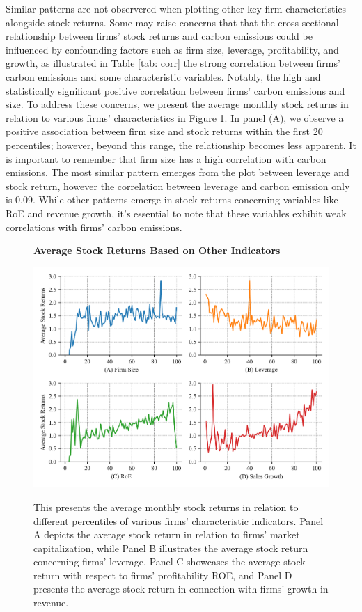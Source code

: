 \documentclass[12pt]{article}
\begin{document}
Similar patterns are not observered when plotting other key firm characteristics alongside stock returns. Some may raise concerns that that the cross-sectional relationship between firms' stock returns and carbon emissions could be influenced by confounding factors such as firm size, leverage, profitability, and growth, as illustrated in Table \ref{tab: corr} the strong correlation between firms' carbon emissions and some characteristic variables. Notably, the high and statistically significant positive correlation between firms' carbon emissions and size. To address these concerns, we present the average monthly stock returns in relation to various firms' characteristics in Figure \ref{fig: others_persentile}. In panel (A), we observe a positive association between firm size and stock returns within the first 20 percentiles; however, beyond this range, the relationship becomes less apparent. It is important to remember that firm size has a high correlation with carbon emissions. The most similar pattern emerges from the plot between leverage and stock return, however the correlation between leverage and carbon emission only is 0.09. While other patterns emerge in stock returns concerning variables like RoE and revenue growth, it's essential to note that these variables exhibit weak correlations with firms' carbon emissions.
\begin{figure}[!ht]
\centering
\caption{\textbf{Average Stock Returns Based on Other Indicators}}
\includegraphics{graphics/other_percentile.png}
\label{fig: others_persentile}
\caption*{\footnotesize{This presents the average monthly stock returns in relation to different percentiles of various firms' characteristic indicators. Panel A depicts the average stock return in relation to firms' market capitalization, while Panel B illustrates the average stock return concerning firms' leverage. Panel C showcases the average stock return with respect to firms' profitability ROE, and Panel D presents the average stock return in connection with firms' growth in revenue.}}
\end{figure}
\end{document}
